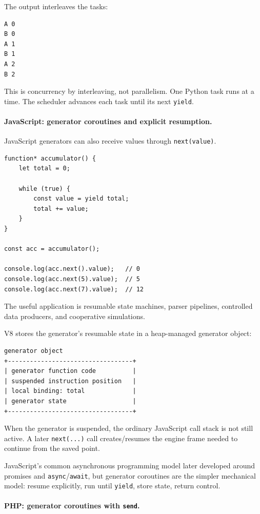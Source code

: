 The output interleaves the tasks:

\begin{verbatim}
A 0
B 0
A 1
B 1
A 2
B 2
\end{verbatim}

This is concurrency by interleaving, not parallelism. One Python task runs at a time. The scheduler advances each task until its next \texttt{yield}.

\paragraph{JavaScript: generator coroutines and explicit resumption.}

JavaScript generators can also receive values through \texttt{next(value)}.

\begin{verbatim}
function* accumulator() {
    let total = 0;

    while (true) {
        const value = yield total;
        total += value;
    }
}

const acc = accumulator();

console.log(acc.next().value);   // 0
console.log(acc.next(5).value);  // 5
console.log(acc.next(7).value);  // 12
\end{verbatim}

The useful application is resumable state machines, parser pipelines, controlled data producers, and cooperative simulations.

V8 stores the generator's resumable state in a heap-managed generator object:

\begin{verbatim}
generator object
+----------------------------------+
| generator function code          |
| suspended instruction position   |
| local binding: total             |
| generator state                  |
+----------------------------------+
\end{verbatim}

When the generator is suspended, the ordinary JavaScript call stack is not still active. A later \texttt{next(...)} call creates/resumes the engine frame needed to continue from the saved point.

JavaScript's common asynchronous programming model later developed around promises and \texttt{async}/\texttt{await}, but generator coroutines are the simpler mechanical model: resume explicitly, run until \texttt{yield}, store state, return control.

\paragraph{PHP: generator coroutines with \texttt{send}.}

